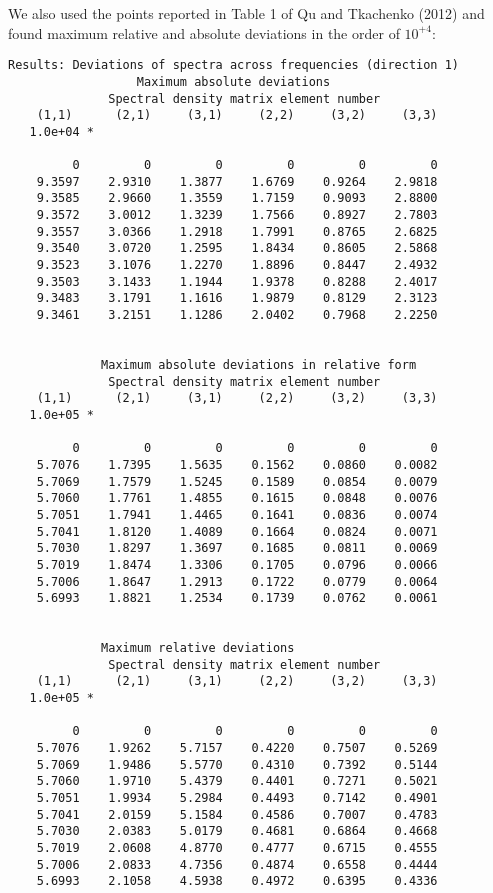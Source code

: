 \documentclass{article}
\begin{document}
We also used the points reported in Table 1 of Qu and Tkachenko (2012) and found maximum relative and absolute deviations in the order of $10^{+4}$:
\begin{verbatim}
Results: Deviations of spectra across frequencies (direction 1)
                  Maximum absolute deviations
              Spectral density matrix element number
    (1,1)      (2,1)     (3,1)     (2,2)     (3,2)     (3,3)
   1.0e+04 *

         0         0         0         0         0         0
    9.3597    2.9310    1.3877    1.6769    0.9264    2.9818
    9.3585    2.9660    1.3559    1.7159    0.9093    2.8800
    9.3572    3.0012    1.3239    1.7566    0.8927    2.7803
    9.3557    3.0366    1.2918    1.7991    0.8765    2.6825
    9.3540    3.0720    1.2595    1.8434    0.8605    2.5868
    9.3523    3.1076    1.2270    1.8896    0.8447    2.4932
    9.3503    3.1433    1.1944    1.9378    0.8288    2.4017
    9.3483    3.1791    1.1616    1.9879    0.8129    2.3123
    9.3461    3.2151    1.1286    2.0402    0.7968    2.2250


             Maximum absolute deviations in relative form
              Spectral density matrix element number
    (1,1)      (2,1)     (3,1)     (2,2)     (3,2)     (3,3)
   1.0e+05 *

         0         0         0         0         0         0
    5.7076    1.7395    1.5635    0.1562    0.0860    0.0082
    5.7069    1.7579    1.5245    0.1589    0.0854    0.0079
    5.7060    1.7761    1.4855    0.1615    0.0848    0.0076
    5.7051    1.7941    1.4465    0.1641    0.0836    0.0074
    5.7041    1.8120    1.4089    0.1664    0.0824    0.0071
    5.7030    1.8297    1.3697    0.1685    0.0811    0.0069
    5.7019    1.8474    1.3306    0.1705    0.0796    0.0066
    5.7006    1.8647    1.2913    0.1722    0.0779    0.0064
    5.6993    1.8821    1.2534    0.1739    0.0762    0.0061


             Maximum relative deviations
              Spectral density matrix element number
    (1,1)      (2,1)     (3,1)     (2,2)     (3,2)     (3,3)
   1.0e+05 *

         0         0         0         0         0         0
    5.7076    1.9262    5.7157    0.4220    0.7507    0.5269
    5.7069    1.9486    5.5770    0.4310    0.7392    0.5144
    5.7060    1.9710    5.4379    0.4401    0.7271    0.5021
    5.7051    1.9934    5.2984    0.4493    0.7142    0.4901
    5.7041    2.0159    5.1584    0.4586    0.7007    0.4783
    5.7030    2.0383    5.0179    0.4681    0.6864    0.4668
    5.7019    2.0608    4.8770    0.4777    0.6715    0.4555
    5.7006    2.0833    4.7356    0.4874    0.6558    0.4444
    5.6993    2.1058    4.5938    0.4972    0.6395    0.4336
\end{verbatim}
\end{document}
